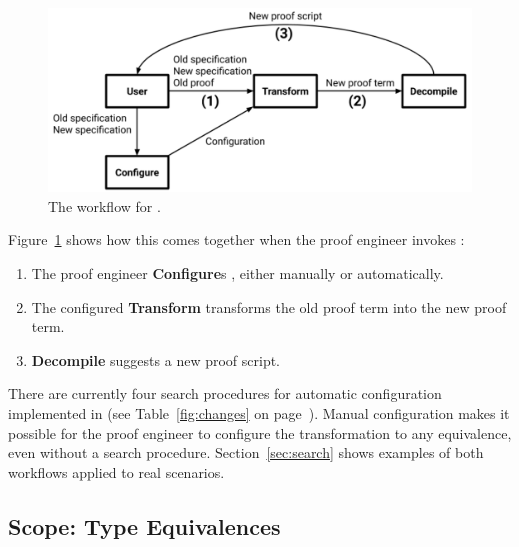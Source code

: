 \begin{figure}
\includegraphics[width=\columnwidth]{often/workflowa.pdf}
\vspace{-0.7cm}
\caption{The workflow for \toolnamec.}
\vspace{-0.1cm}
\label{fig:system}
\end{figure}

Figure~\ref{fig:system} shows how this comes together when the proof engineer invokes \toolnamec:

\begin{enumerate}
\item The proof engineer \textbf{Configure}s \toolnamec, either manually or automatically.
\item The configured \textbf{Transform} transforms the old proof term into the new proof term.
\item \textbf{Decompile} suggests a new proof script. %
\end{enumerate}
There are currently four search procedures for automatic configuration implemented in \toolnamec (see Table~\ref{fig:changes} on page~\pageref{fig:changes}).
Manual configuration makes it possible
for the proof engineer to configure the transformation to any equivalence,
even without a search procedure.
Section~\ref{sec:search} shows examples of both workflows applied to real scenarios.


\subsection{Scope: Type Equivalences}
\label{sec:pi-scope}


